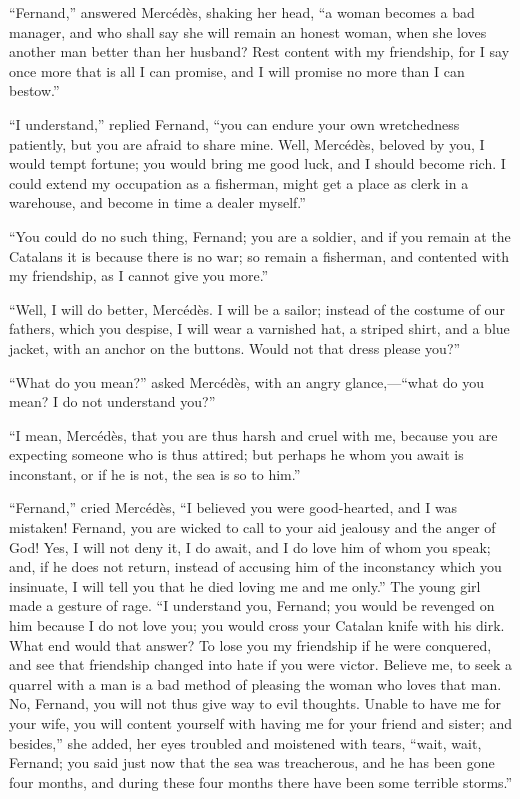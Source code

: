 “Fernand,” answered Mercédès, shaking her head, “a woman becomes a bad
manager, and who shall say she will remain an honest woman, when she
loves another man better than her husband? Rest content with my
friendship, for I say once more that is all I can promise, and I will
promise no more than I can bestow.”

“I understand,” replied Fernand, “you can endure your own wretchedness
patiently, but you are afraid to share mine. Well, Mercédès, beloved by
you, I would tempt fortune; you would bring me good luck, and I should
become rich. I could extend my occupation as a fisherman, might get a
place as clerk in a warehouse, and become in time a dealer myself.”

“You could do no such thing, Fernand; you are a soldier, and if you
remain at the Catalans it is because there is no war; so remain a
fisherman, and contented with my friendship, as I cannot give you
more.”

“Well, I will do better, Mercédès. I will be a sailor; instead of the
costume of our fathers, which you despise, I will wear a varnished hat,
a striped shirt, and a blue jacket, with an anchor on the buttons.
Would not that dress please you?”

“What do you mean?” asked Mercédès, with an angry glance,—“what do you
mean? I do not understand you?”

“I mean, Mercédès, that you are thus harsh and cruel with me, because
you are expecting someone who is thus attired; but perhaps he whom you
await is inconstant, or if he is not, the sea is so to him.”

“Fernand,” cried Mercédès, “I believed you were good-hearted, and I was
mistaken! Fernand, you are wicked to call to your aid jealousy and the
anger of God! Yes, I will not deny it, I do await, and I do love him of
whom you speak; and, if he does not return, instead of accusing him of
the inconstancy which you insinuate, I will tell you that he died
loving me and me only.” The young girl made a gesture of rage. “I
understand you, Fernand; you would be revenged on him because I do not
love you; you would cross your Catalan knife with his dirk. What end
would that answer? To lose you my friendship if he were conquered, and
see that friendship changed into hate if you were victor. Believe me,
to seek a quarrel with a man is a bad method of pleasing the woman who
loves that man. No, Fernand, you will not thus give way to evil
thoughts. Unable to have me for your wife, you will content yourself
with having me for your friend and sister; and besides,” she added, her
eyes troubled and moistened with tears, “wait, wait, Fernand; you said
just now that the sea was treacherous, and he has been gone four
months, and during these four months there have been some terrible
storms.”

